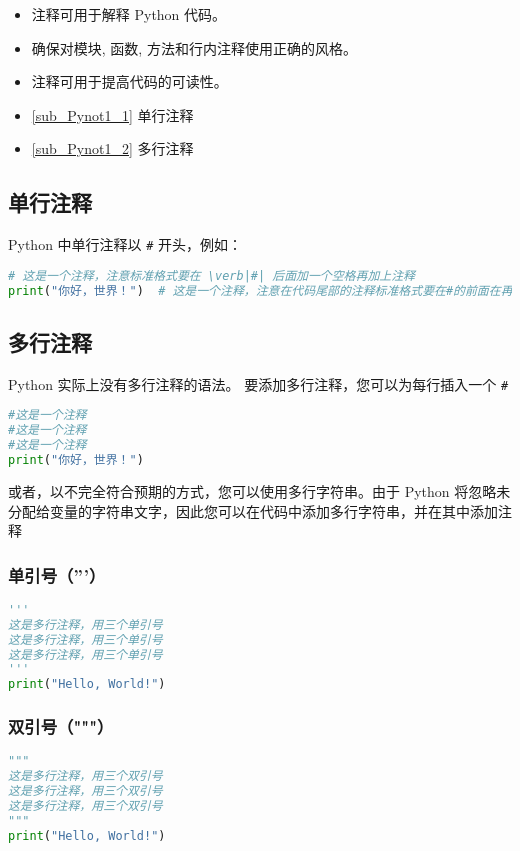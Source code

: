 
\begin{itemize}
\item 注释可用于解释 Python 代码。
\item 确保对模块, 函数, 方法和行内注释使用正确的风格。
\item 注释可用于提高代码的可读性。
\end{itemize}

\begin{itemize}
\item \autoref{sub_Pynot1_1} 单行注释
\item \autoref{sub_Pynot1_2} 多行注释
\end{itemize}

\subsection{单行注释}\label{sub_Pynot1_1}
Python 中单行注释以 \verb|#| 开头，例如：
\begin{lstlisting}[language=python]
# 这是一个注释，注意标准格式要在 \verb|#| 后面加一个空格再加上注释
print("你好，世界！")  # 这是一个注释，注意在代码尾部的注释标准格式要在#的前面在再加两个空格
\end{lstlisting}

\subsection{多行注释}\label{sub_Pynot1_2}
Python 实际上没有多行注释的语法。
要添加多行注释，您可以为每行插入一个 \verb|#|
\begin{lstlisting}[language=python]
#这是一个注释
#这是一个注释
#这是一个注释
print("你好，世界！")
\end{lstlisting}

或者，以不完全符合预期的方式，您可以使用多行字符串。由于 Python 将忽略未分配给变量的字符串文字，因此您可以在代码中添加多行字符串，并在其中添加注释
\subsubsection{单引号（'''）}
\begin{lstlisting}[language=python]
'''
这是多行注释，用三个单引号
这是多行注释，用三个单引号 
这是多行注释，用三个单引号
'''
print("Hello, World!")
\end{lstlisting}

\subsubsection{双引号（"""）}
\begin{lstlisting}[language=python]
"""
这是多行注释，用三个双引号
这是多行注释，用三个双引号 
这是多行注释，用三个双引号
"""
print("Hello, World!")
\end{lstlisting}
